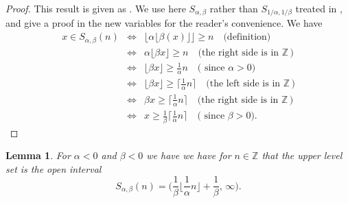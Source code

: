 \documentclass[12pt,letterpaper, reqno]{amsart}
\newtheorem{lem}[thm]{Lemma}
\theoremstyle{definition}
\theoremstyle{remark}
\newcommand{\ZZ}{\ensuremath{\mathbb{Z}}}
\newcommand{\floor}[1]{\lfloor{#1}\rfloor}
\begin{document}
\begin{proof}
This result is given as   \cite[Lemma 1]{LMR16}. 
We use here  $S_{\alpha,\beta}$  rather than $S_{1/\alpha, 1/\beta}$ treated in \cite{LMR16},
and give a proof in the new variables  for the reader's convenience.
We have
\begin{eqnarray*}
x \in S_{\alpha, \beta} (n) & \Leftrightarrow&   \lfloor \alpha \lfloor \beta (x)\rfloor \rfloor  \ge n
\quad \mbox{(definition)}\\
&\Leftrightarrow& \alpha \lfloor \beta x\rfloor  \ge n \quad \mbox{(the right side is in} \,\, \ZZ \,\mbox{)}\\
& \Leftrightarrow& \lfloor \beta x\rfloor \ge \frac{1}{\alpha} n  \quad \mbox{( since $\alpha > 0$)}\\\
& \Leftrightarrow&\lfloor \beta x\rfloor \ge \lceil \frac{1}{\alpha} n \rceil  \quad \mbox{(the left side is in} \,\, \ZZ \,\mbox{)} \\
& \Leftrightarrow& \beta x \ge \lceil \frac{1}{\alpha} n \rceil   \quad \mbox{(the right side is in} \,\, \ZZ \,\mbox{)}\\
&\Leftrightarrow & x \ge \frac{1}{\beta} \lceil \frac{1}{\alpha} n \rceil  \quad \mbox{( since $\beta >0$)}. 
\end{eqnarray*}
\end{proof}

\begin{lem}\label{lem:24}
For $\alpha<0$ and $ \beta <0$ we have 
we have for $n \in \ZZ$  that
the upper level set is the open interval
\[ S_{\alpha,\beta}(n)  = \bigg( \frac1\beta \floor{\frac{1}{\alpha} n} +\frac{1}{\beta}, \, \infty\bigg).
\]
 \end{lem}
 
 
 
\end{document}
